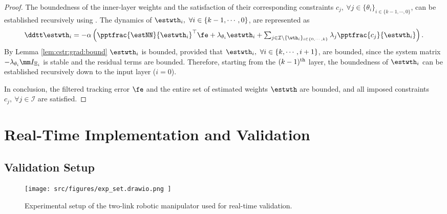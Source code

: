 \documentclass[journal]{IEEEtran}
\begin{document}
\begin{proof}
\hfill 

The boundedness of the inner-layer weights and the satisfaction of their corresponding constraints $c_j,\ \forall j\in\{\theta_i\}_{i\in\{k-1,\cdots,0\}}$, can be established recursively using \cite[Chap.~4 Thm.~1.9]{Desoer:2009aa}.
The dynamics of $\estwth_i,\ \forall i\in\{k-1,\cdots,0\}$, are represented as
\begin{equation}
    \ddtt \estwth_i 
    =
    -\alpha
    \left(
        \pptfrac{\estNN}{\estwth_i}^\top
        \fe
        +
        \lambda_{\theta_i}\estwth_i
        +
        \textstyle\sum_{
            j\in\mathcal{I}\setminus \{\wth_i\}_{i\in\{0,\cdots,k\}}
        }
        \lambda_j
        \pptfrac{c_j}{\estwth_i}
    \right)
    .
\end{equation}
By Lemma \ref{lem:cstr:grad:bound} $\estwth_i$ is bounded, provided that $\estwth_i,\ \forall i\in\{k,\cdots,i+1\}$, are bounded, since the system matrix $-\lambda_{\theta_i} \mm I_{\Xi_i}$ is stable and the residual terms are bounded.
Therefore, starting from the $(k-1)\textsuperscript{th}$ layer, the boundedness of $\estwth_i$ can be established recursively down to the input layer ($i=0$).

\hfill

In conclusion, the filtered tracking error $\fe$ and the entire set of estimated weights $\estwth$ are bounded, and all imposed constraints $c_j,\ \forall j\in\mathcal I$ are satisfied.

\end{proof}

\section{Real-Time Implementation and Validation}\label{sec:sim}

\subsection{Validation Setup}

\begin{figure}[t]
    \centering
        \texttt{[image: 
            src/figures/exp\_set.drawio.png
        ]}%
    \caption{
        Experimental setup of the two-link robotic manipulator used for real-time validation.
    }
    \label{fig:ctrl:exp:set}
\end{figure}
\end{document}
